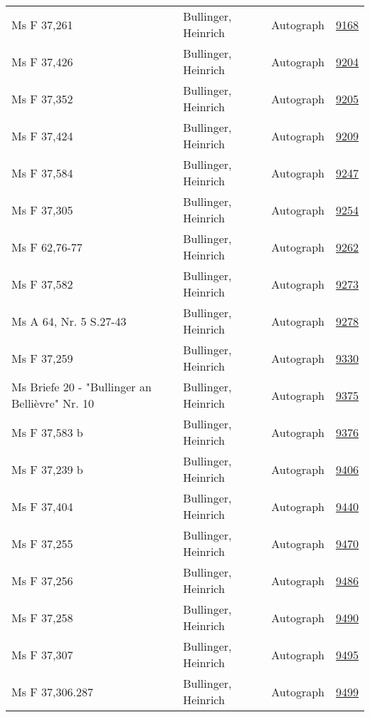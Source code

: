 \documentclass[10pt,a4paper,landscape]{report}
\begin{document}
\begin{longtable}{p{16cm}p{4cm}lr}
Ms F 37,261	&	Bullinger, Heinrich	&	Autograph	&	\href{http://130.60.24.72/assignment/9168}{9168}\\
Ms F 37,426	&	Bullinger, Heinrich	&	Autograph	&	\href{http://130.60.24.72/assignment/9204}{9204}\\
Ms F 37,352	&	Bullinger, Heinrich	&	Autograph	&	\href{http://130.60.24.72/assignment/9205}{9205}\\
Ms F 37,424	&	Bullinger, Heinrich	&	Autograph	&	\href{http://130.60.24.72/assignment/9209}{9209}\\
Ms F 37,584	&	Bullinger, Heinrich	&	Autograph	&	\href{http://130.60.24.72/assignment/9247}{9247}\\
Ms F 37,305	&	Bullinger, Heinrich	&	Autograph	&	\href{http://130.60.24.72/assignment/9254}{9254}\\
Ms F 62,76-77	&	Bullinger, Heinrich	&	Autograph	&	\href{http://130.60.24.72/assignment/9262}{9262}\\
Ms F 37,582	&	Bullinger, Heinrich	&	Autograph	&	\href{http://130.60.24.72/assignment/9273}{9273}\\
Ms A 64, Nr. 5 S.27-43	&	Bullinger, Heinrich	&	Autograph	&	\href{http://130.60.24.72/assignment/9278}{9278}\\
Ms F 37,259	&	Bullinger, Heinrich	&	Autograph	&	\href{http://130.60.24.72/assignment/9330}{9330}\\
Ms Briefe 20 - "Bullinger an Bellièvre" Nr. 10	&	Bullinger, Heinrich	&	Autograph	&	\href{http://130.60.24.72/assignment/9375}{9375}\\
Ms F 37,583 b	&	Bullinger, Heinrich	&	Autograph	&	\href{http://130.60.24.72/assignment/9376}{9376}\\
Ms F 37,239 b	&	Bullinger, Heinrich	&	Autograph	&	\href{http://130.60.24.72/assignment/9406}{9406}\\
Ms F 37,404	&	Bullinger, Heinrich	&	Autograph	&	\href{http://130.60.24.72/assignment/9440}{9440}\\
Ms F 37,255	&	Bullinger, Heinrich	&	Autograph	&	\href{http://130.60.24.72/assignment/9470}{9470}\\
Ms F 37,256	&	Bullinger, Heinrich	&	Autograph	&	\href{http://130.60.24.72/assignment/9486}{9486}\\
Ms F 37,258	&	Bullinger, Heinrich	&	Autograph	&	\href{http://130.60.24.72/assignment/9490}{9490}\\
Ms F 37,307	&	Bullinger, Heinrich	&	Autograph	&	\href{http://130.60.24.72/assignment/9495}{9495}\\
Ms F 37,306.287	&	Bullinger, Heinrich	&	Autograph	&	\href{http://130.60.24.72/assignment/9499}{9499}\\

\end{longtable}
\end{document}
